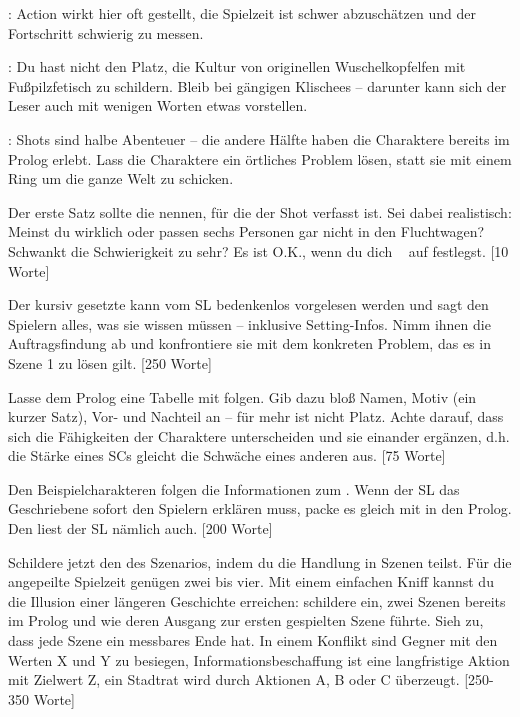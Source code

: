 {		: Action wirkt hier oft gestellt, die Spielzeit ist schwer abzuschätzen und der Fortschritt schwierig zu messen.

		: Du hast nicht den Platz, die Kultur von originellen Wuschelkopfelfen mit Fußpilzfetisch zu schildern. Bleib bei gängigen Klischees -- darunter kann sich der Leser auch mit wenigen Worten etwas vorstellen.

		: Shots sind halbe Abenteuer -- die andere Hälfte haben die Charaktere bereits im Prolog erlebt. Lass die Charaktere ein örtliches Problem lösen, statt sie mit einem Ring um die ganze Welt zu schicken.


		\noindent
		Der erste Satz sollte die  nennen, für die der Shot verfasst ist. Sei dabei realistisch: Meinst du wirklich  oder passen sechs Personen gar nicht in den Fluchtwagen? Schwankt die Schwierigkeit zu sehr? Es ist O.K., wenn du dich \zB~ auf  festlegst. [10 Worte]

		Der kursiv gesetzte  kann vom SL bedenkenlos vorgelesen werden und sagt den Spielern alles, was sie wissen müssen -- inklusive Setting-Infos. Nimm ihnen die Auftragsfindung ab und konfrontiere sie mit dem konkreten Problem, das es in Szene 1 zu lösen gilt. [250 Worte]

		Lasse dem Prolog eine Tabelle mit  folgen. Gib dazu bloß Namen, Motiv (ein kurzer Satz), Vor- und Nachteil an -- für mehr ist nicht Platz. Achte darauf, dass sich die Fähigkeiten der Charaktere unterscheiden und sie einander ergänzen, d.h. die Stärke eines SCs gleicht die Schwäche eines anderen aus. [75 Worte]

		Den Beispielcharakteren folgen die Informationen zum . Wenn der SL das Geschriebene sofort den Spielern erklären muss, packe es gleich mit in den Prolog. Den liest der SL nämlich auch. [200 Worte]

		Schildere jetzt den  des Szenarios, indem du die Handlung in Szenen teilst. Für die angepeilte Spielzeit genügen zwei bis vier. Mit einem einfachen Kniff kannst du die Illusion einer längeren Geschichte erreichen: schildere ein, zwei Szenen bereits im Prolog und wie deren Ausgang zur ersten gespielten Szene führte. Sieh zu, dass jede Szene ein messbares Ende hat. In einem Konflikt sind Gegner mit den Werten X und Y zu besiegen, Informationsbeschaffung ist eine langfristige Aktion mit Zielwert Z, ein Stadtrat wird durch Aktionen A, B oder C überzeugt. [250-350 Worte]

}
